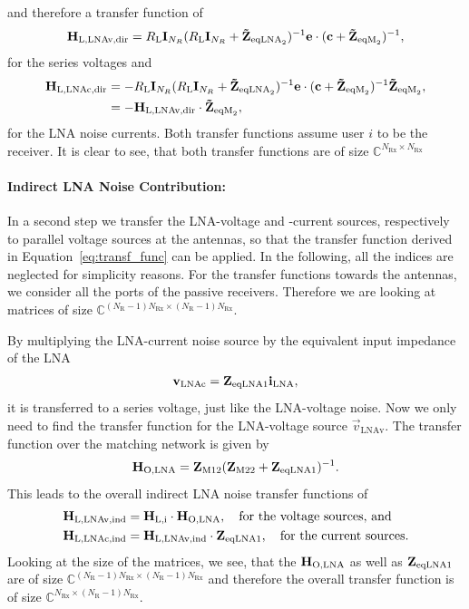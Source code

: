 and therefore a transfer function of
\begin{equation}
\label{eq:lnavdir}
\mathbf{H}_\text{L,LNAv,dir} = R_\text{L}\mathbf{I}_{N_R}(R_\text{L}\mathbf{I}_{N_R} + \mathbf{\tilde{Z}}_{\text{eqLNA}_2})^{-1}\mathbf{e}\cdot(\mathbf{c}+\mathbf{\tilde{Z}}_{\text{eqM}_2})^{-1},
\end{equation}
for the series voltages and
\begin{align}\nonumber
\label{eq:lnacdir}
\mathbf{H}_\text{L,LNAc,dir} &= -R_\text{L}\mathbf{I}_{N_R}(R_\text{L}\mathbf{I}_{N_R} + \mathbf{\tilde{Z}}_{\text{eqLNA}_2})^{-1}\mathbf{e}\cdot(\mathbf{c}+\mathbf{\tilde{Z}}_{\text{eqM}_2})^{-1}\mathbf{\tilde{Z}}_{\text{eqM}_2},\\
 &= - \mathbf{H}_\text{L,LNAv,dir}\cdot \mathbf{\tilde{Z}}_{\text{eqM}_2},
\end{align}
for the LNA noise currents.
Both transfer functions assume user $i$ to be the receiver.
It is clear to see, that both transfer functions are of size $\mathbb{C}^{N_\text{Rx}\times N_\text{Rx}}$

\paragraph{Indirect LNA Noise Contribution:}
In a second step we transfer the LNA-voltage and -current sources, respectively to parallel voltage sources at the antennas, so that the transfer function derived in Equation~\eqref{eq:transf_func} can be applied.
In the following, all the indices are neglected for simplicity reasons.
For the transfer functions towards the antennas, we consider all the ports of the passive receivers.
Therefore we are looking at matrices of size $\mathbb{C}^{(N_\text{R}-1)N_\text{Rx}\times (N_\text{R}-1)N_\text{Rx}}$.

By multiplying the LNA-current noise source by the equivalent input impedance of the LNA
\begin{align}
\mathbf{v}_\text{LNAc} = \mathbf{Z}_{\text{eqLNA1}} \mathbf{i}_\text{LNA},
\end{align}
it is transferred to a series voltage, just like the LNA-voltage noise.
Now we only need to find the transfer function for the LNA-voltage source $\vec{v}_\text{LNAv}$.
The transfer function over the matching network is given by
\begin{align}
\label{eq:lnanoise_to_input}
\mathbf{H}_\text{O,LNA} = \mathbf{Z}_\text{M12}(\mathbf{Z}_\text{M22}+\mathbf{Z}_{\text{eqLNA1}})^{-1}.
\end{align}
This leads to the overall indirect LNA noise transfer functions of
\begin{align}
\label{eq:lnaind}\nonumber
\mathbf{H}_\text{L,LNAv,ind} &= \mathbf{H}_\text{L,i}\cdot\mathbf{H}_\text{O,LNA},\quad\text{for the voltage sources, and}\\
\mathbf{H}_\text{L,LNAc,ind} &= \mathbf{H}_\text{L,LNAv,ind}\cdot\mathbf{Z}_{\text{eqLNA1}},\quad\text{for the current sources}.
\end{align}
Looking at the size of the matrices, we see, that the $\mathbf{H}_\text{O,LNA}$ as well as $\mathbf{Z}_{\text{eqLNA1}}$ are of size $\mathbb{C}^{(N_\text{R}-1)N_\text{Rx}\times (N_\text{R}-1)N_\text{Rx}}$ and therefore the overall transfer function is of size $\mathbb{C}^{N_\text{Rx}\times (N_\text{R}-1)N_\text{Rx}}$.


